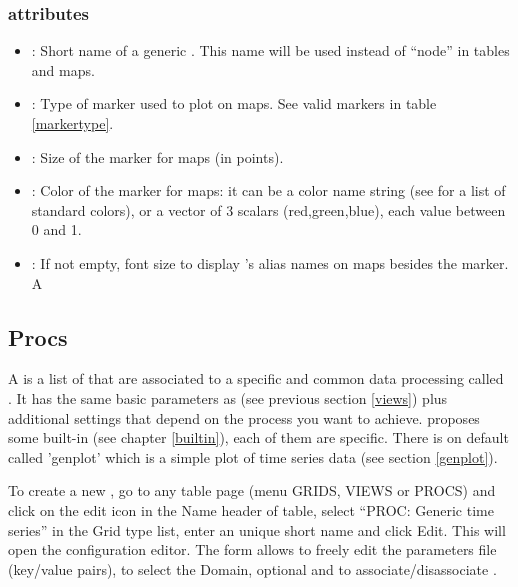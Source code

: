 \subsubsection{ attributes}
\begin{itemize}

\item {}: Short name of a generic . This name will be used instead of ``node'' in tables and maps.

\item {}: Type of marker used to plot  on maps. See valid markers in table \ref{markertype}.

\item {}: Size of the  marker for maps (in points).

\item {}: Color of the  marker for maps: it can be a color name string (see  for a list of standard colors), or a vector of 3 scalars (red,green,blue), each value between 0 and 1.

\item {}: If not empty, font size to display 's alias names on maps besides the marker. A

\end{itemize}



\subsection{Procs}
\label{procs}

A  is a list of  that are associated to a specific and common data processing called . It has the same basic parameters as  (see previous section \ref{views}) plus additional settings that depend on the process you want to achieve. \webobs proposes some built-in  (see chapter \ref{builtin}), each of them are specific. There is on default  called 'genplot' which is a simple plot of time series data (see section \ref{genplot}).

To create a new , go to any  table page (menu GRIDS, VIEWS or PROCS) and click on the edit icon in the Name header of table, select ``PROC: Generic time series'' in the Grid type list, enter an unique short name and click Edit. This will open the  configuration editor. The form allows to freely edit the parameters file (key/value pairs), to select the Domain, optional  and to associate/disassociate .

